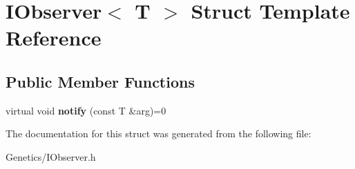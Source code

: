 \hypertarget{struct_i_observer}{}\section{I\+Observer$<$ T $>$ Struct Template Reference}
\label{struct_i_observer}
\subsection*{Public Member Functions}
\begin{DoxyCompactItemize}
\item 
virtual void {\bfseries notify} (const T \&arg)=0\hypertarget{struct_i_observer_a218fcc53f11b591e002c7f3552b26a78}{}\label{struct_i_observer_a218fcc53f11b591e002c7f3552b26a78}

\end{DoxyCompactItemize}


The documentation for this struct was generated from the following file\+:\begin{DoxyCompactItemize}
\item 
Genetics/I\+Observer.\+h\end{DoxyCompactItemize}
